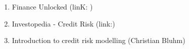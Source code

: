 \documentclass[a4paper,12pt]{article}
\begin{document}
    \begin{enumerate}
        \item Finance Unlocked (linK: )
        \item Investopedia - Credit Risk (link:)
        \item Introduction to credit risk modelling (Christian Bluhm)

    \end{enumerate}
\end{document}
